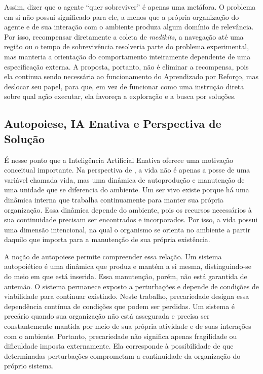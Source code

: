 Assim, dizer que o agente ``quer sobreviver'' é apenas uma metáfora. O problema em si não possui significado para ele, a menos que a própria organização do agente e de sua interação com o ambiente produza algum domínio de relevância. Por isso, recompensar diretamente a coleta de \textit{medikits}, a navegação até uma região ou o tempo de sobrevivência resolveria parte do problema experimental, mas manteria a orientação do comportamento inteiramente dependente de uma especificação externa. A proposta, portanto, não é eliminar a recompensa, pois ela continua sendo necessária ao funcionamento do Aprendizado por Reforço, mas deslocar seu papel, para que, em vez de funcionar como uma instrução direta sobre qual ação executar, ela favoreça a exploração e a busca por soluções.

\subsection{Autopoiese, IA Enativa e Perspectiva de Solução}
\label{subsec:autopoiese-ia-enativa-solucao}

É nesse ponto que a Inteligência Artificial Enativa oferece uma motivação conceitual importante. Na perspectiva de , a vida não é apenas a posse de uma variável chamada vida, mas uma dinâmica de autoprodução e manutenção de uma unidade que se diferencia do ambiente. Um ser vivo existe porque há uma dinâmica interna que trabalha continuamente para manter sua própria organização. Essa dinâmica depende do ambiente, pois os recursos necessários à sua continuidade precisam ser encontrados e incorporados. Por isso, a vida possui uma dimensão intencional, na qual o organismo se orienta no ambiente a partir daquilo que importa para a manutenção de sua própria existência.

A noção de autopoiese permite compreender essa relação. Um sistema autopoiético é uma dinâmica que produz e mantém a si mesma, distinguindo-se do meio em que está inserida. Essa manutenção, porém, não está garantida de antemão. O sistema permanece exposto a perturbações e depende de condições de viabilidade para continuar existindo. Neste trabalho, precariedade designa essa dependência contínua de condições que podem ser perdidas. Um sistema é precário quando sua organização não está assegurada e precisa ser constantemente mantida por meio de sua própria atividade e de suas interações com o ambiente. Portanto, precariedade não significa apenas fragilidade ou dificuldade imposta externamente. Ela corresponde à possibilidade de que determinadas perturbações comprometam a continuidade da organização do próprio sistema.

